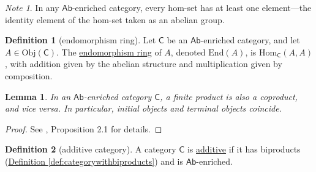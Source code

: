 \documentclass[a4paper]{report}
\newcommand{\defn}[1]{\ul{#1}}
\newcommand{\Obj}{\mathrm{Obj}}
\newcommand{\Hom}{\mathrm{Hom}}
\theoremstyle{definition}
\newtheorem{definition}{Definition}[section]
\theoremstyle{plain}
\newtheorem{lemma}{Lemma}[section]
\theoremstyle{remark}
\newtheorem{note}{Note}[section]
\begin{document}
\begin{note}
  \label{note:inabenrichedcategorynoemptyhomsets}
  In any $\mathsf{Ab}$-enriched category, every hom-set has at least one element---the identity element of the hom-set taken as an abelian group.
\end{note}

\begin{definition}[endomorphism ring]
  \label{def:endomorphismring}
  Let $\mathsf{C}$ be an $\mathsf{Ab}$-enriched category, and let $A \in \Obj(\mathsf{C})$. The \defn{endomorphism ring} of $A$, denoted $\mathrm{End}(A)$, is $\Hom_{\mathsf{C}}(A, A)$, with addition given by the abelian structure and multiplication given by composition.
\end{definition}

\begin{lemma}
  \label{lemma:abeliancategorycoproductsareproducts}
  In an $\mathsf{Ab}$-enriched category $\mathsf{C}$, a finite product is also a coproduct, and vice versa. In particular, initial objects and terminal objects coincide.
\end{lemma}
\begin{proof}


  See \cite{nlab-additive-category}, Proposition 2.1 for details.
\end{proof}

\begin{definition}[additive category]
  \label{def:additivecategory}
  A category $\mathsf{C}$ is \defn{additive} if it has biproducts (\hyperref[def:categorywithbiproducts]{Definition \ref*{def:categorywithbiproducts}}) and is $\mathsf{Ab}$-enriched.
\end{definition}
\end{document}
